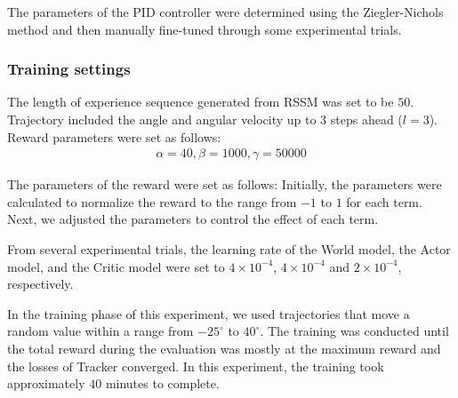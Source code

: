 \documentclass[letterpaper, 10 pt, conference]{ieeeconf}  %
\begin{document}
The parameters of the PID controller were determined using the Ziegler-Nichols method and then manually fine-tuned through some experimental trials.

\subsubsection{Training settings}

The length of experience sequence generated from RSSM was set to be $50$. Trajectory included the angle and angular velocity up to $3$ steps ahead ($l=3$).
Reward parameters were set as follows:
\begin{equation}
\begin{split}
    \alpha=40, \beta=1000, \gamma=50000
\end{split}
\end{equation}


The parameters of the reward were set as follows: Initially, the parameters were calculated to normalize the reward to the range from $-1$ to $1$ for each term. Next, we adjusted the parameters to control the effect of each term.

From several experimental trials, the learning rate of the World model, the Actor model, and the Critic model were set to $4\times 10^{-4}$, $4\times 10^{-4}$ and $2\times 10^{-4}$, respectively.


In the training phase of this experiment,
we used trajectories that move a random value within a range from $-25^{\circ}$ to $40^{\circ}$.
The training was conducted until the total reward during the evaluation was mostly at the maximum reward and the losses of Tracker converged.
In this experiment, the training took approximately $40$ minutes to complete.
\end{document}
